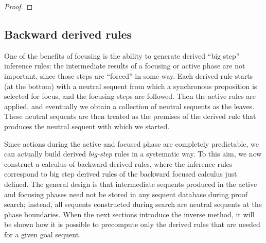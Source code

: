 \begin{proof}
\end{proof}

\subsection{Backward derived rules}

One of the benefits of focusing is the ability to generate derived ``big step''
inference rules: the intermediate results of a focusing or active phase are not
important, since those steps are ``forced'' in some way. Each derived rule
starts (at the bottom) with a neutral sequent from which a synchronous
proposition is selected for focus, and the focusing steps are followed. Then the
active rules are applied, and eventually we obtain a collection of neutral
sequents as the leaves. These neutral sequents are then treated as the premises
of the derived rule that produces the neutral sequent with which we started.

Since actions during the active and focused phase are completely predictable, we
can actually build derived \emph{big-step} rules in a systematic way. To this
aim, we now construct a calculus of backward derived rules, where the inference
rules correspond to big step derived rules of the backward focused calculus just
defined. The general design is that intermediate sequents produced in the active
and focusing phases need not be stored in any sequent database during proof
search; instead, all sequents constructed during search are neutral sequents at
the phase boundaries. When the next sections introduce the inverse method, it
will be shown how it is possible to precompute only the derived rules that are
needed for a given goal sequent.

